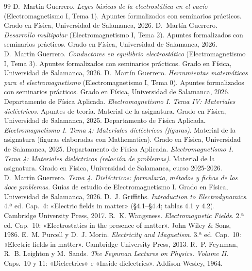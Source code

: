 \begin{thebibliography}{99}
\setlength{\itemsep}{0.25em}
\small
{} D.~Martín Guerrero. \emph{Leyes básicas de la electrostática en el vacío} (Electromagnetismo I, Tema 1). Apuntes formalizados con
  seminarios prácticos. Grado en Física, Universidad de Salamanca, 2026.
 D.~Martín Guerrero. \emph{Desarrollo multipolar} (Electromagnetismo I, Tema 2). Apuntes formalizados con seminarios prácticos. Grado
  en Física, Universidad de Salamanca, 2026.
 D.~Martín Guerrero. \emph{Conductores en equilibrio electrostático} (Electromagnetismo I, Tema 3). Apuntes formalizados con seminarios
  prácticos. Grado en Física, Universidad de Salamanca, 2026.
 D.~Martín Guerrero. \emph{Herramientas matemáticas para el electromagnetismo} (Electromagnetismo I, Tema 0). Apuntes formalizados con
  seminarios prácticos. Grado en Física, Universidad de Salamanca, 2026.
 Departamento de Física Aplicada. \emph{Electromagnetismo I. Tema IV: Materiales dieléctricos}. Apuntes de teoría. Material de la
  asignatura. Grado en Física, Universidad de Salamanca, 2025.
 Departamento de Física Aplicada. \emph{Electromagnetismo I. Tema 4: Materiales dieléctricos (figuras)}. Material de la asignatura
  (figuras elaboradas con Mathematica). Grado en Física, Universidad de Salamanca, 2025.
 Departamento de Física Aplicada. \emph{Electromagnetismo I. Tema 4: Materiales dieléctricos (relación de problemas)}. Material
  de la asignatura. Grado en Física, Universidad de Salamanca, curso 2025-2026.
 D.~Martín Guerrero. \emph{Tema 4. Dieléctricos: formulario, métodos y fichas de los doce problemas}. Guías de estudio de
  Electromagnetismo I. Grado en Física, Universidad de Salamanca, 2026.
 D.~J. Griffiths. \emph{Introduction to Electrodynamics}. 4.ª ed. Cap.~4: «Electric fields in matter» (§4.1--§4.4; tablas 4.1 y 4.2).
  Cambridge University Press, 2017.
 R.~K. Wangsness. \emph{Electromagnetic Fields}. 2.ª ed. Cap.~10: «Electrostatics in the presence of matter». John Wiley \& Sons, 1986.
 E.~M. Purcell y D.~J. Morin. \emph{Electricity and Magnetism}. 3.ª ed. Cap.~10: «Electric fields in matter». Cambridge University
  Press, 2013.
 R.~P. Feynman, R.~B. Leighton y M.~Sands. \emph{The Feynman Lectures on Physics. Volume II}. Caps.~10 y 11: «Dielectrics» e «Inside
  dielectrics». Addison-Wesley, 1964.

\end{thebibliography}
